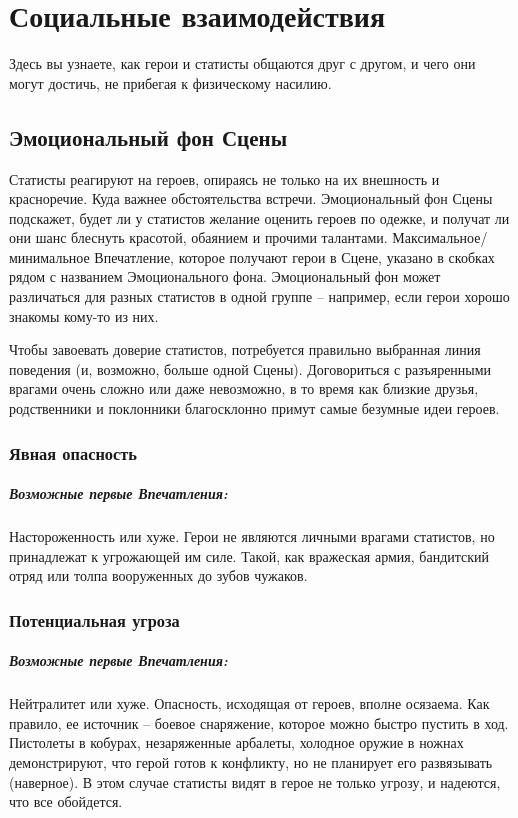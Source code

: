 \chapter{Социальные взаимодействия}
Здесь вы узнаете, как герои и статисты общаются друг с другом, и чего они могут достичь, не прибегая к физическому насилию.

\section{Эмоциональный фон Сцены}
Статисты реагируют на героев, опираясь не только на их внешность и красноречие. Куда важнее обстоятельства встречи. 
\newline Эмоциональный фон Сцены подскажет, будет ли у статистов желание оценить героев по одежке, и получат ли они шанс блеснуть красотой, обаянием и прочими талантами. Максимальное/минимальное Впечатление, которое получают герои в Сцене, указано в скобках рядом с названием Эмоционального фона. 
\newline Эмоциональный фон может различаться для разных статистов в одной группе – например, если герои хорошо знакомы кому-то из них.
\begin{tcolorbox}
  Чтобы завоевать доверие статистов, потребуется правильно выбранная линия поведения (и, возможно, больше одной Сцены). Договориться с разъяренными врагами очень сложно или даже невозможно, в то время как близкие друзья, родственники и поклонники благосклонно примут самые безумные идеи героев.
\end{tcolorbox}

\subsection{Явная опасность}
\paragraph{Возможные первые Впечатления:} Настороженность или хуже.
\newline Герои не являются личными врагами статистов, но принадлежат к угрожающей им силе. Такой, как вражеская армия, бандитский отряд или толпа вооруженных до зубов чужаков.

\subsection{Потенциальная угроза}
\paragraph{Возможные первые Впечатления:} Нейтралитет или хуже.
\newline Опасность, исходящая от героев, вполне осязаема. Как правило, ее источник – боевое снаряжение, которое можно быстро пустить в ход. Пистолеты в кобурах, незаряженные арбалеты, холодное оружие в ножнах демонстрируют, что герой готов к конфликту, но не планирует его развязывать (наверное). В этом случае статисты видят в герое не только угрозу, и надеются, что все обойдется.


